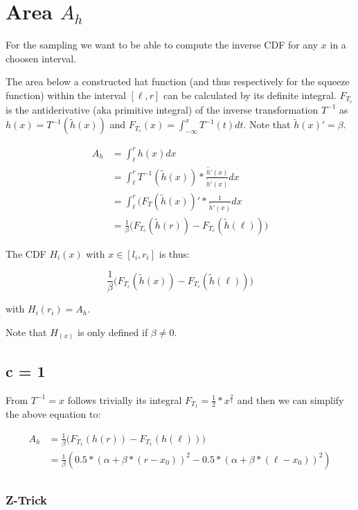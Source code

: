 \section{Area $A_h$}

For the sampling we want to be able to compute the inverse CDF for any $x$ in a choosen interval.

The area below a constructed hat function (and thus respectively for the squeeze function) within the interval $[\ell, r]$ can be calculated by its definite integral. $F_{T_c}$ is the antiderivative (aka primitive integral) of the inverse transformation $T^{-1}$ as $h(x) = T^{-1}(\tilde{h}(x))$ and $F_{T_c}(x) = \int_{-\infty}^{x} T^{-1}(t) dt$. Note that $\tilde{h}(x)' = \beta$.

\begin{align*}
A_h &= \int_{\ell}^{r} h(x) dx \\
	&= \int_{\ell}^{r} T^{-1}(\tilde{h}(x)) * \frac{\tilde{h'}(x)}{\tilde{h}'(x)} dx \\
	&= \int_{\ell}^{r} (F_T(\tilde{h}(x))' * \frac{1}{\tilde{h}'(x)} dx \\
&= \frac{1}{\beta} \big( F_{T_c} (\tilde{h}(r)) - F_{T_c}(\tilde{h}(\ell)) \big)
\end{align*}

The CDF $H_i(x)$ with $x \in [l_i, r_i]$ is thus:

\[ \frac{1}{\beta} \big( F_{T_c} (\tilde{h}(x)) - F_{T_c}(\tilde{h}(\ell)) \big) \]

with $H_i(r_i) = A_h$.


Note that $H_(x)$ is only defined if $\beta \neq 0$.

\subsection{c = 1}

From  $T^{-1} = x$ follows trivially its integral $F_{T_1} = \frac{1}{2} * x^{\frac{2}{1}}$
and then we can simplify the above equation to:

\begin{align*}
A_h &= \frac{1}{\beta} \big(F_{T_1}(h(r)) - F_{T_1}(h(\ell)) \big) \\
&= \frac{1}{\beta} \left(0.5 * (\alpha + \beta * (r - x_0))^2 - 0.5 * (\alpha + \beta * (\ell - x_0))^2 \right) \\
\end{align*}

\subsubsection{Z-Trick}

